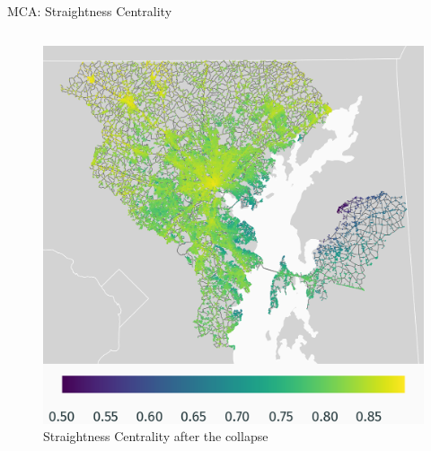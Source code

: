 \documentclass{beamer}
\numberwithin{figure}{section} %
\numberwithin{table}{section} %
\begin{document}
\begin{frame}{MCA: Straightness Centrality}
\begin{columns}
        \begin{column}{0.33\textwidth}
            \begin{figure}
                \centering
                \includegraphics[width=\textwidth]{maps/straightness_wo_bridge.png}
                {\scriptsize Straightness Centrality after the collapse}
            \end{figure}
        \end{column}


\end{columns}
\end{frame}
\end{document}
